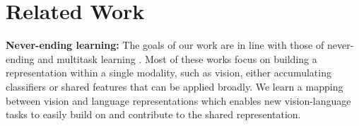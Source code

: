 \documentclass[10pt,twocolumn,letterpaper]{article}
\newcommand\todo[1]{\textcolor{red}{#1}}
\begin{document}
\section{Related Work}
\noindent


\noindent \textbf{Never-ending learning:} The goals of our work are in line with those of never-ending \cite{mitchell2010never,carlson2010toward,thrun1998lifelong,silver2013lifelong,chen2013iccv} and multitask learning \cite{caruana1998springer}. Most of these works focus on building a representation within a single modality, such as vision, either accumulating classifiers or shared features that can be applied broadly.  We learn a mapping between vision and language representations which enables new vision-language tasks to easily build on and contribute to the shared representation.  

\end{document}
